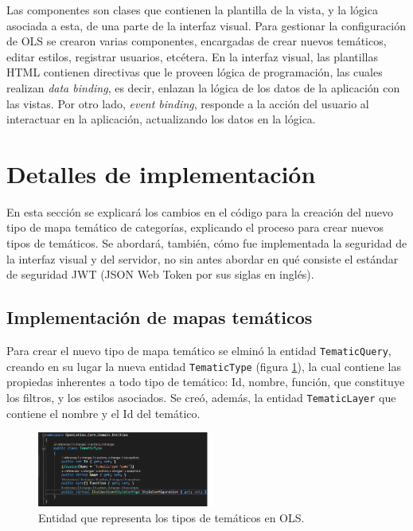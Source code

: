 Las componentes son clases que contienen la plantilla de la vista, y la l\'ogica asociada a esta, de una parte de la interfaz visual. Para gestionar la configuraci\'on de OLS se crearon varias componentes, encargadas de crear nuevos tem\'aticos, editar estilos, registrar usuarios, etc\'etera. En la interfaz visual, las plantillas HTML contienen directivas que le proveen l\'ogica de programaci\'on, las cuales realizan \textit{data binding}, es decir, enlazan la l\'ogica de los datos de la aplicaci\'on con las vistas. Por otro lado, \textit{event binding}, responde a la acci\'on del usuario al interactuar en la aplicaci\'on, actualizando los datos en la l\'ogica.


\section{Detalles de implementaci\'on}
En esta secci\'on se explicar\'a los cambios en el c\'odigo para la creaci\'on del nuevo tipo de mapa tem\'atico de categor\'ias, explicando el proceso para crear nuevos tipos de tem\'aticos. Se abordar\'a, tambi\'en, c\'omo fue implementada la seguridad de la interfaz visual y del servidor, no sin antes abordar en qu\'e consiste el est\'andar de seguridad JWT (JSON Web Token por sus siglas en ingl\'es).

\subsection{Implementaci\'on de mapas tem\'aticos}
Para crear el nuevo tipo de mapa tem\'atico se elmin\'o la entidad \texttt{TematicQuery}, creando en su lugar la nueva entidad \texttt{TematicType} (figura \ref{tematicType}), la cual contiene las propiedas inherentes a todo tipo de tem\'atico: Id, nombre, funci\'on, que constituye los filtros, y los estilos asociados. Se cre\'o, adem\'as, la entidad \texttt{TematicLayer} que contiene el nombre y el Id del tem\'atico.

\begin{figure}
\vspace{-20pt}
\begin{center}
\includegraphics[width=0.52\textwidth]{images/tematicType.png} 
\end{center} \vspace{-20pt} \caption{Entidad que representa los tipos de tem\'aticos en OLS.}  \label{tematicType} \vspace{-10pt} 
\end{figure}

